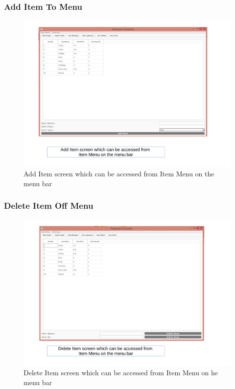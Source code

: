 \begin{landscape}
\subsubsection{Add Item To Menu}
\begin{figure}[H]
    \includegraphics[width = 15cm]{./Maintenance/images/screen5}
    \caption{Add Item screen which can be accessed from Item Menu on the menu bar} \label{fig:screen5}
\end{figure}

\subsubsection{Delete Item Off Menu}
\begin{figure}[H]
    \includegraphics[width = 15cm]{./Maintenance/images/screen6}
    \caption{Delete Item screen which can be accessed from Item Menu on he menu bar} \label{fig:screen6}
\end{figure}


\end{landscape}
